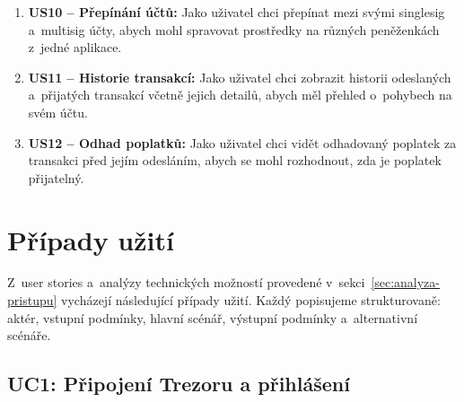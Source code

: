 \begin{enumerate}
  \item \textbf{US10 -- Přepínání účtů:}
        Jako uživatel chci přepínat mezi svými singlesig a~multisig účty, abych mohl
        spravovat prostředky na různých peněženkách z~jedné aplikace.

  \item \textbf{US11 -- Historie transakcí:}
        Jako uživatel chci zobrazit historii odeslaných a~přijatých transakcí včetně
        jejich detailů, abych měl přehled o~pohybech na svém účtu.

  \item \textbf{US12 -- Odhad poplatků:}
        Jako uživatel chci vidět odhadovaný poplatek za transakci před jejím
        odesláním, abych se mohl rozhodnout, zda je poplatek přijatelný.
\end{enumerate}

\section{Případy užití}
\label{sec:use-cases}

Z~user stories a~analýzy technických možností provedené
v~sekci~\ref{sec:analyza-pristupu} vycházejí následující případy užití.
Každý popisujeme strukturovaně: aktér, vstupní podmínky, hlavní scénář,
výstupní podmínky a~alternativní scénáře.

\subsection{UC1: Připojení Trezoru a přihlášení}
\label{uc:login}


